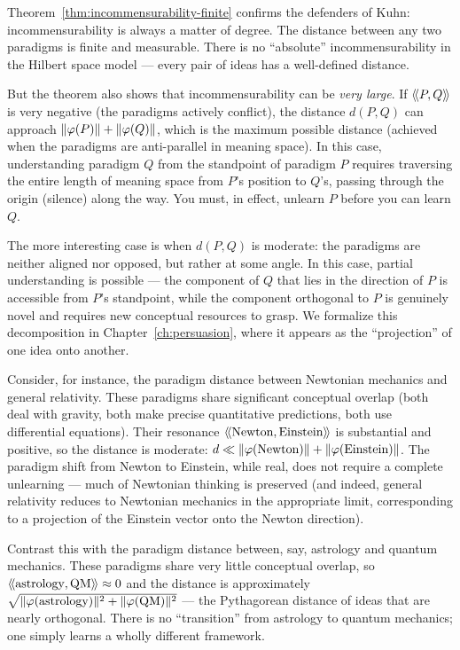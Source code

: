 \begin{interpretation}
\label{interp:kuhn}
Theorem~\ref{thm:incommensurability-finite} confirms the defenders of Kuhn:
incommensurability is always a matter of degree. The distance between any two
paradigms is finite and measurable. There is no ``absolute'' incommensurability
in the Hilbert space model --- every pair of ideas has a well-defined distance.

But the theorem also shows that incommensurability can be \emph{very large}.
If $\langle\!\langle P, Q \rangle\!\rangle$ is very negative (the paradigms actively conflict), the distance
$d(P, Q)$ can approach $\lVert \varphi(P) \rVert + \lVert \varphi(Q) \rVert$, which is the
maximum possible distance (achieved when the paradigms are anti-parallel in
meaning space). In this case, understanding paradigm $Q$ from the standpoint of
paradigm $P$ requires traversing the entire length of meaning space from $P$'s
position to $Q$'s, passing through the origin (silence) along the way. You must,
in effect, unlearn $P$ before you can learn $Q$.

The more interesting case is when $d(P, Q)$ is moderate: the paradigms are
neither aligned nor opposed, but rather at some angle. In this case, partial
understanding is possible --- the component of $Q$ that lies in the direction of
$P$ is accessible from $P$'s standpoint, while the component orthogonal to $P$
is genuinely novel and requires new conceptual resources to grasp. We formalize
this decomposition in Chapter~\ref{ch:persuasion}, where it appears as the
``projection'' of one idea onto another.

Consider, for instance, the paradigm distance between Newtonian mechanics and
general relativity. These paradigms share significant conceptual overlap (both
deal with gravity, both make precise quantitative predictions, both use
differential equations). Their resonance $\langle\!\langle \text{Newton}, \text{Einstein} \rangle\!\rangle$
is substantial and positive, so the distance is moderate: $d \ll
\lVert \varphi(\text{Newton}) \rVert + \lVert \varphi(\text{Einstein}) \rVert$. The paradigm shift
from Newton to Einstein, while real, does not require a complete unlearning ---
much of Newtonian thinking is preserved (and indeed, general relativity reduces
to Newtonian mechanics in the appropriate limit, corresponding to a projection
of the Einstein vector onto the Newton direction).

Contrast this with the paradigm distance between, say, astrology and quantum
mechanics. These paradigms share very little conceptual overlap, so $\langle\!\langle \text{astrology}, \text{QM} \rangle\!\rangle \approx 0$ and the distance is approximately
$\sqrt{\lVert \varphi(\text{astrology}) \rVert^2 + \lVert \varphi(\text{QM}) \rVert^2}$ --- the
Pythagorean distance of ideas that are nearly orthogonal. There is no
``transition'' from astrology to quantum mechanics; one simply learns a wholly
different framework.
\end{interpretation}


